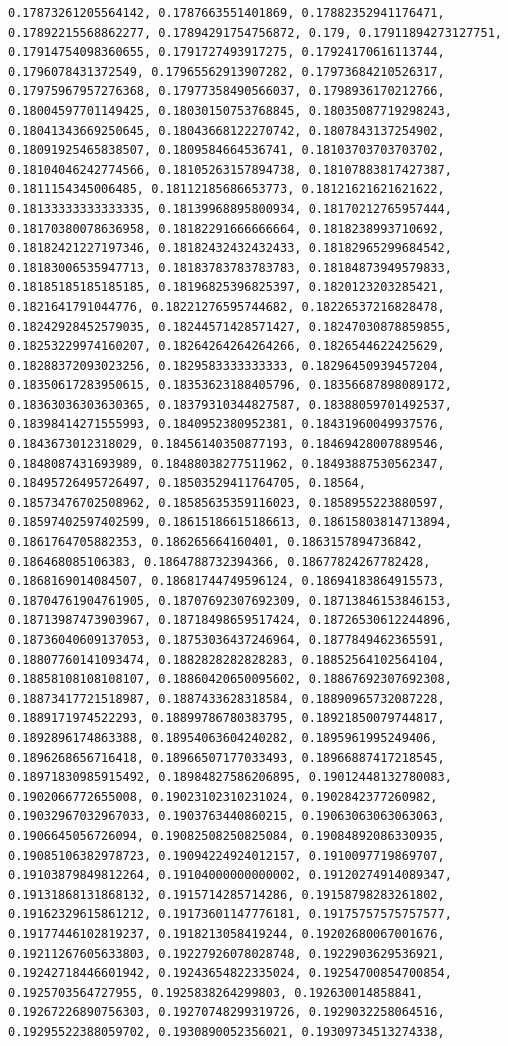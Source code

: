 \documentclass[11pt]{article}
\begin{document}
\begin{Verbatim}[commandchars=\\\{\}]
0.17873261205564142, 0.1787663551401869, 0.17882352941176471, 0.17892215568862277, 0.17894291754756872, 0.179, 0.17911894273127751, 0.17914754098360655, 0.1791727493917275, 0.17924170616113744, 0.1796078431372549, 0.17965562913907282, 0.17973684210526317, 0.17975967957276368, 0.17977358490566037, 0.1798936170212766, 0.18004597701149425, 0.18030150753768845, 0.18035087719298243, 0.18041343669250645, 0.18043668122270742, 0.1807843137254902, 0.18091925465838507, 0.1809584664536741, 0.18103703703703702, 0.18104046242774566, 0.18105263157894738, 0.18107883817427387, 0.1811154345006485, 0.18112185686653773, 0.18121621621621622, 0.18133333333333335, 0.18139968895800934, 0.18170212765957444, 0.18170380078636958, 0.18182291666666664, 0.1818238993710692, 0.18182421227197346, 0.18182432432432433, 0.18182965299684542, 0.18183006535947713, 0.18183783783783783, 0.18184873949579833, 0.18185185185185185, 0.18196825396825397, 0.1820123203285421, 0.1821641791044776, 0.18221276595744682, 0.18226537216828478, 0.18242928452579035, 0.18244571428571427, 0.18247030878859855, 0.18253229974160207, 0.18264264264264266, 0.1826544622425629, 0.18288372093023256, 0.1829583333333333, 0.18296450939457204, 0.18350617283950615, 0.18353623188405796, 0.18356687898089172, 0.18363036303630365, 0.18379310344827587, 0.18388059701492537, 0.18398414271555993, 0.1840952380952381, 0.18431960049937576, 0.1843673012318029, 0.18456140350877193, 0.18469428007889546, 0.1848087431693989, 0.18488038277511962, 0.18493887530562347, 0.18495726495726497, 0.18503529411764705, 0.18564, 0.18573476702508962, 0.18585635359116023, 0.1858955223880597, 0.18597402597402599, 0.18615186615186613, 0.18615803814713894, 0.1861764705882353, 0.186265664160401, 0.1863157894736842, 0.186468085106383, 0.1864788732394366, 0.18677824267782428, 0.1868169014084507, 0.18681744749596124, 0.18694183864915573, 0.18704761904761905, 0.18707692307692309, 0.18713846153846153, 0.18713987473903967, 0.18718498659517424, 0.18726530612244896, 0.18736040609137053, 0.18753036437246964, 0.1877849462365591, 0.18807760141093474, 0.1882828282828283, 0.18852564102564104, 0.18858108108108107, 0.18860420650095602, 0.18867692307692308, 0.18873417721518987, 0.1887433628318584, 0.18890965732087228, 0.1889171974522293, 0.18899786780383795, 0.18921850079744817, 0.1892896174863388, 0.18954063604240282, 0.1895961995249406, 0.1896268656716418, 0.18966507177033493, 0.18966887417218545, 0.18971830985915492, 0.18984827586206895, 0.19012448132780083, 0.1902066772655008, 0.19023102310231024, 0.1902842377260982, 0.19032967032967033, 0.1903763440860215, 0.19063063063063063, 0.1906645056726094, 0.19082508250825084, 0.19084892086330935, 0.19085106382978723, 0.19094224924012157, 0.1910097719869707, 0.19103879849812264, 0.19104000000000002, 0.19120274914089347, 0.19131868131868132, 0.1915714285714286, 0.19158798283261802, 0.19162329615861212, 0.19173601147776181, 0.19175757575757577, 0.19177446102819237, 0.1918213058419244, 0.19202680067001676, 0.19211267605633803, 0.19227926078028748, 0.1922903629536921, 0.19242718446601942, 0.19243654822335024, 0.19254700854700854, 0.1925703564727955, 0.1925838264299803, 0.192630014858841, 0.19267226890756303, 0.19270748299319726, 0.1929032258064516, 0.19295522388059702, 0.1930890052356021, 0.19309734513274338, 
\end{Verbatim}
\end{document}
